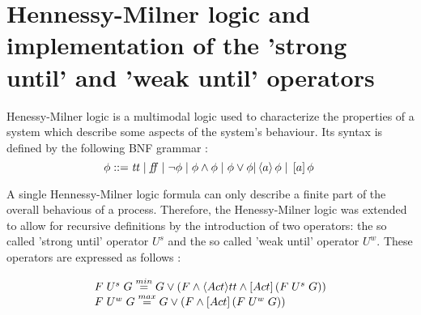 \section{Hennessy-Milner logic and implementation of the 'strong until' and 'weak until' operators}
\label{sec:hml}

Henessy-Milner logic \cite{HennessyMilner} is a multimodal logic used to characterize the properties of a system which describe some aspects of the system's behaviour. Its syntax is defined by the following BNF grammar \cite{ModellingAndAnalysis}:
\begin{equation}\label{eq:hml_bnf}
\phi ::= \mathit{tt} \hspace{1 mm} | \hspace{1 mm} \mathit{ff} \hspace{1 mm} | \hspace{1 mm} \neg\phi \hspace{1 mm} | \hspace{1 mm}\phi\wedge\phi \hspace{1 mm} |
\hspace{1 mm} \phi\vee\phi | \left\langle a\right\rangle \phi \hspace{1 mm} | \hspace{1 mm} \left[a\right]\phi \hspace{1 mm}
\end{equation}

A single Hennessy-Milner logic formula can only describe a finite part of the overall behavious of a process. Therefore, the Henessy-Milner logic was extended to allow for recursive definitions by the introduction of two operators: the so called 'strong until' operator $U^{s}$ and the so called 'weak until' operator $U^{w}$. These operators are expressed as follows \cite{ReactiveSystems}:

\begin{equation}
	\begin{array}{lcl}
		F \hspace{1 mm} U^{s} \hspace{1 mm} G \stackrel{min}{=} G \vee \left(F \wedge \langle Act \rangle tt \wedge \left[Act\right]\left(F \hspace{1 mm} U^{s} \hspace{1 mm} G\right)\right)\\
		F \hspace{1 mm} U^{w} \hspace{1 mm} G \stackrel{max}{=} G \vee \left(F \wedge \left[Act\right] \left(F \hspace{1 mm} U^{w} \hspace{1 mm} G\right)\right)
	\end{array}
\end{equation}

